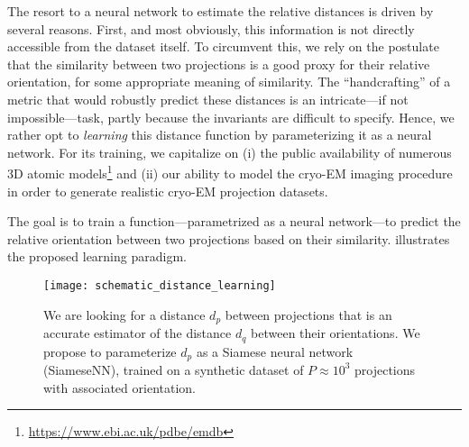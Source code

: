 The resort to a neural network to estimate the relative distances is driven by several reasons. First, and most obviously, this information is not directly accessible from the dataset itself. To circumvent this, we rely on the postulate that the similarity between two projections is a good proxy for their relative orientation, for some appropriate meaning of similarity. The ``handcrafting'' of a metric that would robustly predict these distances is an intricate---if not impossible---task, partly because the invariants are difficult to specify. Hence, we rather opt to \textit{learning} this distance function by parameterizing it as a neural network. For its training, we capitalize on (i) the public availability of numerous 3D atomic models\footnote{\url{https://www.ebi.ac.uk/pdbe/emdb}} and (ii) our ability to model the cryo-EM imaging procedure in order to generate realistic cryo-EM projection datasets.

The goal is to train a function---parametrized as a neural network---to predict the relative orientation between two projections based on their similarity.  illustrates the proposed learning paradigm.

\begin{figure}
    \centering
    \texttt{[image: schematic\_distance\_learning]}
    \caption{%
        We are looking for a distance $d_p$ between projections that is an accurate estimator of the distance $d_q$ between their orientations.
        We propose to parameterize $d_p$ as a Siamese neural network (SiameseNN), trained on a synthetic dataset of $P \approx 10^3$ projections with associated orientation.
}\label{fig:schematic:distance-learning}
\end{figure}

